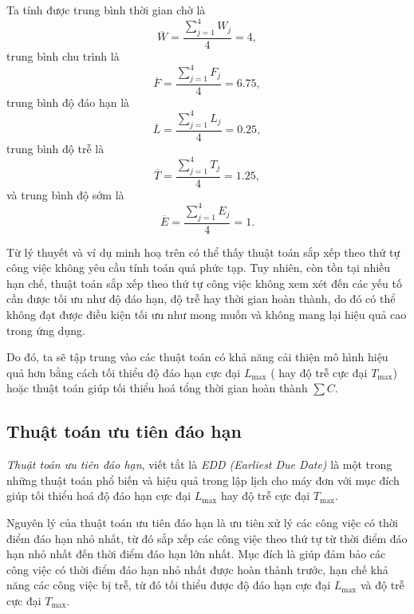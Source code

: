 \begin{vd}
Ta tính được trung bình thời gian chờ là
\begin{equation*}
\overline{W} = \frac{\sum_{j=1}^4 W_j}{4} = 4,
\end{equation*}
trung bình chu trình là
\begin{equation*}
\overline{F} = \frac{\sum_{j=1}^4 F_j}{4} = 6.75,
\end{equation*}
trung bình độ đáo hạn là
\begin{equation*}
\overline{L} = \frac{\sum_{j=1}^4 L_j}{4} = 0.25,
\end{equation*}
trung bình độ trễ là
\begin{equation*}
\overline{T} = \frac{\sum_{j=1}^4 T_j}{4} = 1.25,
\end{equation*}
và trung bình độ sớm là
\begin{equation*}
\overline{E} = \frac{\sum_{j=1}^4 E_j}{4} = 1.
\end{equation*}
\end{vd}

Từ lý thuyết và ví dụ minh hoạ trên có thể thấy thuật toán sắp xếp theo thứ tự công việc không yêu cầu tính toán quá phức tạp. Tuy nhiên, còn tồn tại nhiều hạn chế, thuật toán sắp xếp theo thứ tự công việc không xem xét đến các yếu tố cần được tối ưu như độ đáo hạn, độ trễ hay thời gian hoàn thành, do đó có thể không đạt được điều kiện tối ưu như mong muốn và không mang lại hiệu quả cao trong ứng dụng.

Do đó, ta sẽ tập trung vào các thuật toán có khả năng cải thiện mô hình hiệu quả hơn bằng cách tối thiểu độ đáo hạn cực đại $L_{\max}$ ( hay độ trễ cực đại $T_{\max}$) hoặc thuật toán giúp tối thiểu hoá tổng thời gian hoàn thành $\sum C$.
\subsection{Thuật toán ưu tiên đáo hạn}
\textit{Thuật toán ưu tiên đáo hạn}, viết tắt là \textit{EDD (Earliest Due Date)} là một trong những thuật toán phổ biến và hiệu quả trong lập lịch cho máy đơn với mục đích giúp tối thiểu hoá độ đáo hạn cực đại $L_{\max}$ hay độ trễ cực đại $T_{\max}$.

Nguyên lý của thuật toán ưu tiên đáo hạn là ưu tiên xử lý các công việc có thời điểm đáo hạn nhỏ nhất, từ đó sắp xếp các công việc theo thứ tự từ thời điểm đáo hạn nhỏ nhất đến thời điểm đáo hạn lớn nhất. Mục đích là giúp đảm bảo các công việc có thời điểm đáo hạn nhỏ nhất được hoàn thành trước, hạn chế khả năng các công việc bị trễ, từ đó tối thiểu được độ đáo hạn cực đại $L_{\max}$ và độ trễ cực đại $T_{\max}$.

